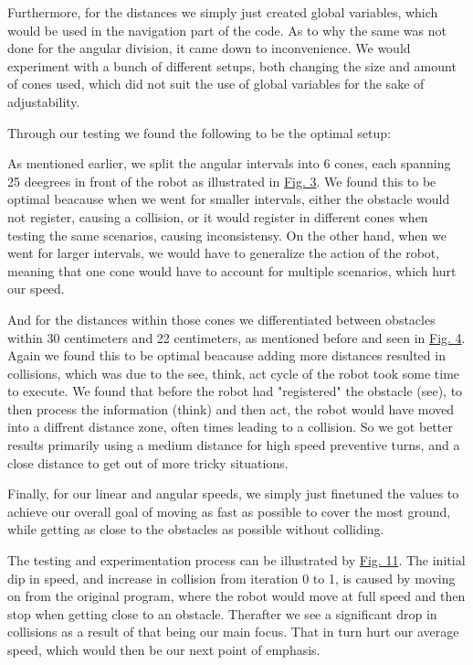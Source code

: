 \documentclass[conference]{IEEEtran}
\begin{document}
Furthermore, for the distances we simply just created global variables, which would be used in the navigation part of the code.
As to why the same was not done for the angular division, it came down to inconvenience.
We would experiment with a bunch of different setups, both changing the size and amount of cones used, which did not suit the use of global variables for the sake of adjustability.

Through our testing we found the following to be the optimal setup:

As mentioned earlier, we split the angular intervals into 6 cones, each spanning 25 deegrees in front of the robot as illustrated in \href{sec:angles}{Fig. 3}.
We found this to be optimal beacause when we went for smaller intervals, either the obstacle would not register, causing a collision, or it would register in different cones when testing the same scenarios, causing inconsistensy.
On the other hand, when we went for larger intervals, we would have to generalize the action of the robot, meaning that one cone would have to account for multiple scenarios, which hurt our speed.

And for the distances within those cones we differentiated between obstacles within 30 centimeters and 22 centimeters, as mentioned before and seen in \href{sec:distances}{Fig. 4}.
Again we found this to be optimal beacause adding more distances resulted in collisions, which was due to the see, think, act cycle of the robot took some time to execute.
We found that before the robot had "registered" the obstacle (see), to then process the information (think) and then act, the robot would have moved into a diffrent distance zone, often times leading to a collision.
So we got better results primarily using a medium distance for high speed preventive turns, and a close distance to get out of more tricky situations.

Finally, for our linear and angular speeds, we simply just finetuned the values to achieve our overall goal of moving as fast as possible to cover the most ground, while getting as close to the obstacles as possible without colliding.

The testing and experimentation process can be illustrated by \href{sec:graph}{Fig. 11}.
The initial dip in speed, and increase in collision from iteration 0 to 1, is caused by moving on from the original program, where the robot would move at full speed and then stop when getting close to an obstacle.
Therafter we see a significant drop in collisions as a result of that being our main focus.
That in turn hurt our average speed, which would then be our next point of emphasis.
\end{document}
